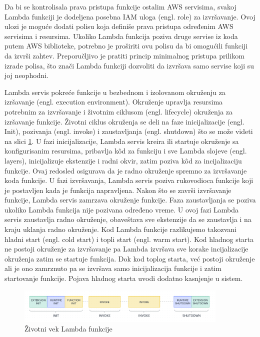 \documentclass[12pt,oneside]{memoir}
\begin{document}
 
Da bi se kontrolisala prava pristupa funkcije ostalim AWS servisima, svakoj Lambda funkciji je dodeljena posebna IAM uloga (engl. role) za izvršavanje. Ovoj ulozi je moguće dodati polisu koja definiše prava pristupa određenim AWS servisima i resursima. Ukoliko Lambda funkcija poziva druge servise iz koda putem AWS biblioteke, potrebno je proširiti ovu polisu da bi omogućili funkciji da izvrši zahtev. Preporučljivo je pratiti princip minimalnog pristupa prilikom izrade polisa, što znači Lambda funkciji dozvoliti da izvršava samo servise koji su joj neophodni. 

 
Lambda servis pokreće funkcije u bezbednom i izolovanom okruženju za izršavanje (engl. execution environment). Okruženje upravlja resursima potrebnim za izvršavanje i životnim ciklusom (engl. lifecycle) okruženja za izršavanje funkcije. Životni ciklus okruženja se deli na faze inicijalizacije (engl. Init), pozivanja (engl. invoke) i zaustavljanja (engl. shutdown) što se može videti na slici \ref{fig:awsLambdaZivotniVek}. U fazi inicijalizacije, Lambda servis kreira ili startuje okruženje sa konfigurisanim resursima, pribavlja kôd za funkciju i sve Lambda slojeve (engl. layers), inicijalizuje ekstenzije i radni okvir, zatim poziva kôd za incijalizaciju funkcije. Ovaj redosled osigurava da je radno okruženje spremno za izvršavanje koda funkcije. U fazi izvršavanja, Lambda servis poziva rukovodioca funkcije koji je postavljen kada je funkcija napravljena. Nakon što se završi izvršavanje funkcije, Lambda servis zamrzava okruženje funkcije. Faza zaustavljanja se poziva ukoliko Lambda funkcija nije pozivana određeno vreme. U ovoj fazi Lambda servis zaustavlja radno okruženje, obaveštava sve ekstenzije da se zaustavlja i na kraju uklanja radno okruženje. Kod Lambda funkcije razlikujemo takozvani hladni start (engl. cold start) i topli start (engl. warm start). Kod hladnog starta ne postoji okruženje za izvršavanje pa Lambda izvršava sve korake incijalizacije okruženja zatim se startuje funkcija. Dok kod toplog starta, već postoji okruženje ali je ono zamrznuto pa se izvršava samo inicijalizacija funkcije i zatim startovanje funkcije. Pojava hladnog starta uvodi dodatno kasnjenje u sistem. 
 

\begin{figure}[!ht]
  \centering
  \includegraphics[width=0.9\textwidth]{AWS-Lambda-zivotnivek.png}
  \caption{Životni vek Lambda funkcije}
  \label{fig:awsLambdaZivotniVek}
\end{figure}
 
\end{document}
